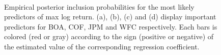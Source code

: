 \documentclass[twoside,11pt]{article}
\begin{document}
\begin{figure}[h]
\\
\caption{Empirical posterior inclusion probabilities for the most likely predictors of max log return. (a), (b), (c) and (d) display important predictors for BOA, COF, JPM and WFC respectively. Each bars is colored (red or gray) according to the sign (positive or negative) of the estimated value of the corresponding regression coefficient.}
\label{fig:prob}
\end{figure}
\end{document}
